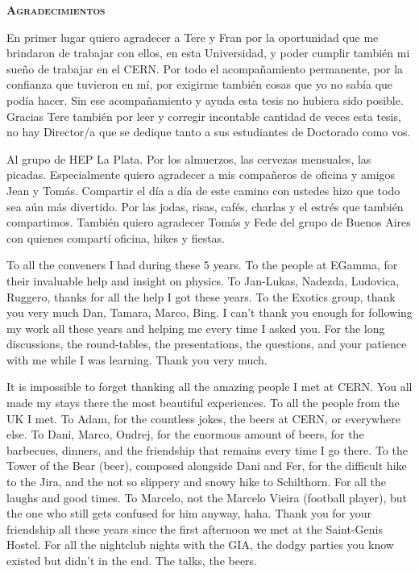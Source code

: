 \pagestyle{empty}%
\begin{center}
	\Huge \textsc{\textbf{Agradecimientos}}
	\hrulefill
\end{center}



En primer lugar quiero agradecer a Tere y Fran por la oportunidad que me brindaron de trabajar con ellos, en esta Universidad, y poder cumplir también mi sueño de trabajar en el CERN. Por todo el acompañamiento permanente, por la confianza que tuvieron en mí, por exigirme también cosas que yo no sabía que podía hacer. Sin ese acompañamiento y ayuda esta tesis no hubiera sido posible. 
Gracias Tere también por leer y corregir incontable cantidad de veces esta tesis, no hay Director/a que se dedique tanto a sus estudiantes de Doctorado como vos.

Al grupo de HEP La Plata. Por los almuerzos, las cervezas mensuales, las picadas. Especialmente quiero agradecer a mis compañeros de oficina y amigos Jean y Tomás. Compartir el día a día de este camino con ustedes hizo que todo sea aún más divertido. Por las jodas, risas, cafés, charlas y el estrés que también compartimos. También quiero agradecer Tomás y Fede del grupo de Buenos Aires con quienes compartí oficina, hikes y fiestas.

To all the conveners I had during these 5 years. To the people at EGamma, for their invaluable help and insight on physics. To Jan-Lukas, Nadezda, Ludovica, Ruggero, thanks for all the help I got these years. To the Exotics group, thank you very much Dan, Tamara, Marco, Bing. I can't thank you enough for following my work all these years and helping me every time I asked you. For the long discussions, the round-tables, the presentations, the questions, and your patience with me while I was learning. Thank you very much.

It is impossible to forget thanking all the amazing people I met at CERN. You all made my stays there the most beautiful experiences. To all the people from the UK I met. To Adam, for the countless jokes, the beers at CERN, or everywhere else. To Dani, Marco, Ondrej, for the enormous amount of beers, for the barbecues, dinners, and the friendship that remains every time I go there. To the Tower of the Bear (beer), composed alongside Dani and Fer, for the difficult hike to the Jira, and the not so slippery and snowy hike to Schilthorn. For all the laughs and good times. To Marcelo, not the Marcelo Vieira (football player), but the one who still gets confused for him anyway, haha. Thank you for your friendship all these years since the first afternoon we met at the Saint-Genis Hostel. For all the nightclub nights with the GIA, the dodgy parties you know existed but didn't in the end. The talks, the beers.

